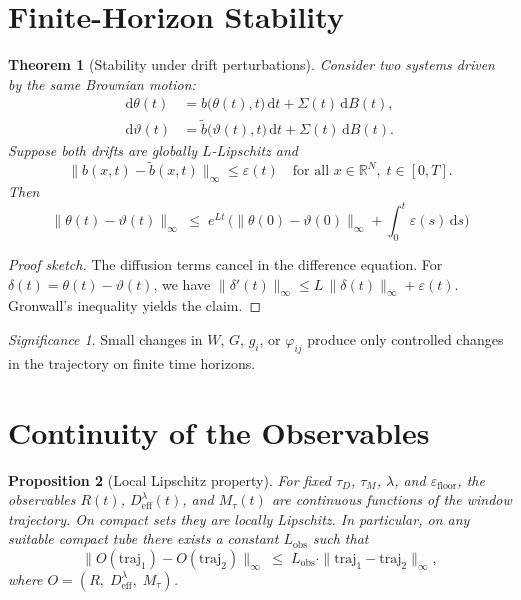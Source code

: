 \documentclass[11pt]{article}
\theoremstyle{plain}
\newtheorem{theorem}{Theorem}[section]
\newtheorem{proposition}[theorem]{Proposition}
\theoremstyle{definition}
\theoremstyle{remark}
\newtheorem*{significance}{Significance}
\newcommand{\Deff}{D_{\mathrm{eff}}}
\newcommand{\Mtau}{M_{\tau}}
\newcommand{\Lobs}{L_{\mathrm{obs}}}
\begin{document}
\section{Finite-Horizon Stability}

\begin{theorem}[Stability under drift perturbations]
\label{satz:stabilitaet}
Consider two systems driven by the same Brownian motion:
\begin{align}
\mathrm{d}\theta(t) &= b\bigl(\theta(t),t\bigr)\,\mathrm{d}t + \Sigma(t)\,\mathrm{d}B(t), \\
\mathrm{d}\vartheta(t) &= \tilde{b}\bigl(\vartheta(t),t\bigr)\,\mathrm{d}t + \Sigma(t)\,\mathrm{d}B(t).
\end{align}
Suppose both drifts are globally $L$-Lipschitz and
\begin{equation}
\|b(x,t) - \tilde{b}(x,t)\|_{\infty} \leq \varepsilon(t) \quad \text{for all } x \in \mathbb{R}^N,\; t \in [0,T].
\end{equation}
Then
\begin{equation}
\label{eq:gronwall}
\boxed{\;
\|\theta(t) - \vartheta(t)\|_{\infty}
\;\leq\; e^{Lt}\,\biggl(\|\theta(0) - \vartheta(0)\|_{\infty} + \int_0^t \varepsilon(s)\,\mathrm{d}s\biggr)
\;}
\end{equation}
\end{theorem}

\begin{proof}[Proof sketch]
The diffusion terms cancel in the difference equation. For $\delta(t) = \theta(t) - \vartheta(t)$, we have $\|\delta'(t)\|_{\infty} \leq L\,\|\delta(t)\|_{\infty} + \varepsilon(t)$. Gronwall's inequality yields the claim.
\end{proof}

\begin{significance}
Small changes in $W$, $G$, $g_i$, or $\varphi_{ij}$ produce only controlled changes in the trajectory on finite time horizons.
\end{significance}


\section{Continuity of the Observables}

\begin{proposition}[Local Lipschitz property]
\label{prop:stetigkeit}
For fixed $\tau_D$, $\tau_M$, $\lambda$, and $\varepsilon_{\mathrm{floor}}$, the observables $R(t)$, $\Deff^{\lambda}(t)$, and $\Mtau(t)$ are continuous functions of the window trajectory. On compact sets they are locally Lipschitz. In particular, on any suitable compact tube there exists a constant $\Lobs$ such that
\begin{equation}
\label{eq:Lobs}
\|O(\mathrm{traj}_1) - O(\mathrm{traj}_2)\|_{\infty} \;\leq\; \Lobs \cdot \|\mathrm{traj}_1 - \mathrm{traj}_2\|_{\infty},
\end{equation}
where $O = (R,\;\Deff^{\lambda},\;\Mtau)$.
\end{proposition}
\end{document}
